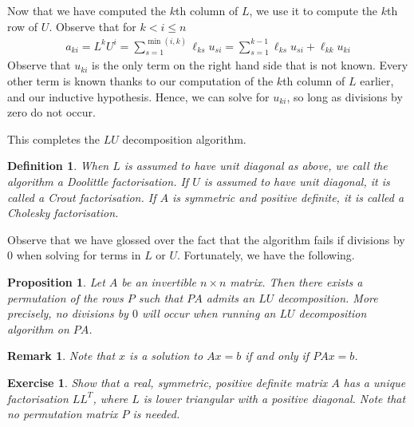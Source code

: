\documentclass[12pt,reqno]{amsart}
\numberwithin{equation}{section}  %
\newtheorem{proposition}[theorem]{Proposition}
\newtheorem*{definition}{Definition}
\newtheorem*{remark}{Remark}
\newtheorem*{exercise}{Exercise}
\begin{document}
Now that we have computed the $k$th column of $L$, we use it
to compute the $k$th row of $U$. Observe that for $k < i \le n$
\begin{align*}
a_{ki} = L^k U^i = \sum_{s=1}^{\min(i,k)}\ell_{ks}u_{si}
= \sum_{s=1}^{k-1} \ell_{ks} u_{si} + \ell_{kk} u_{ki}
\end{align*}
Observe that $u_{ki}$ is the only term on the right hand side
that is not known. Every other term is known thanks to our computation
of the $k$th column of $L$ earlier, and our inductive hypothesis. Hence,
we can solve for $u_{ki}$, so long as divisions by zero do not occur.

This completes the $LU$ decomposition algorithm. 

\begin{definition}
When $L$ is assumed to have unit diagonal
as above, we call the algorithm a \emph{Doolittle factorisation}. 
If $U$ is assumed to have unit diagonal, it is called a \emph{Crout
factorisation}. If $A$ is symmetric and positive definite, it is called a
\emph{Cholesky factorisation}.
\end{definition}
Observe that we have glossed over the fact that the algorithm fails
if divisions by $0$ when solving for terms in $L$ or $U$. Fortunately,
we have the following.
\begin{proposition}
Let $A$ be an invertible $n \times n$ matrix. Then there exists
a permutation of the rows $P$ such that $PA$ admits 
an $LU$ decomposition. More precisely, no divisions by $0$ will
occur when running an $LU$ decomposition algorithm on $PA$.
\end{proposition}
\begin{remark}
Note that $x$ is a solution to $Ax = b$ if and only if $PAx = b$.
\end{remark}
\begin{exercise}
Show that a real, symmetric, positive definite matrix $A$ has a unique
factorisation $L L^T$, where $L$ is lower triangular
with a positive diagonal. Note that no permutation matrix $P$ is needed.
\end{exercise}
\end{document}
